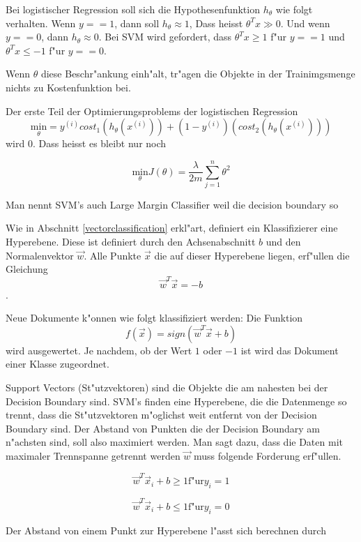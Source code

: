 \documentclass[12pt,a4paper,twoside]{article}
\begin{document}
Bei logistischer Regression soll sich die Hypothesenfunktion $h_{\theta}$ wie folgt verhalten.
Wenn $y == 1$, dann soll $h_{\theta} \approx 1$, Dass heisst $\theta^T x \gg 0$. Und wenn $y == 0$, dann $h_{\theta} \approx 0$. Bei SVM wird gefordert, dass $\theta^T x \geq 1$ f"ur $y == 1$ und $\theta^T x \leq -1$ f"ur $y == 0$.

Wenn $\theta$ diese Beschr"ankung einh"alt, tr"agen die Objekte in der Trainimgsmenge nichts zu Kostenfunktion bei.

Der erste Teil der Optimierungsproblems der logistischen Regression
\begin{equation}
  \label{eq:costsvm}
\underset{\theta}{\text{min}}   = y^{(i)} cost_1(h_{\theta}(x^{(i)})) + (1 - y^{(i)})(cost_2(h_{\theta}(x^{(i)}))) 
\end{equation}
wird 0. Dass heisst es bleibt nur noch

\begin{equation}
  \label{eq:opt}
  \underset{\theta}{\text{min}}  J(\theta) = \frac{\lambda}{2m} \sum_{j=1}^n \theta^2
\end{equation}

Man nennt SVM's auch Large Margin Classifier weil die decision boundary so

Wie in Abschnitt \ref{vectorclassification} erkl"art, definiert ein Klassifizierer eine Hyperebene. Diese ist definiert durch den Achsenabschnitt $b$ und den Normalenvektor $ \vec w $. Alle Punkte $\vec x $ die auf dieser Hyperebene liegen, erf"ullen die Gleichung 
\[
\vec w^T \vec x = -b
\].

Neue Dokumente k"onnen wie folgt klassifiziert werden: Die Funktion
\[
f(\vec x ) = sign( \vec w^T \vec x + b)
\]
wird ausgewertet. Je nachdem, ob der Wert $1$ oder $-1$ ist wird das Dokument einer Klasse zugeordnet.

Support Vectors (St"utzvektoren) sind die Objekte die am nahesten bei der Decision Boundary sind. SVM's finden eine Hyperebene, die die Datenmenge so trennt, dass die St"utzvektoren m"oglichst weit entfernt von der Decision Boundary sind. Der Abstand von Punkten die der Decision Boundary am n"achsten sind, soll also  maximiert werden. Man sagt dazu, dass die Daten mit maximaler Trennspanne getrennt werden $\vec w$ muss folgende Forderung erf"ullen.

\[
\vec w^T \vec x_i + b \geq 1 \text{f"ur} y_i = 1
\]

\[
\vec w^T \vec x_i + b \leq 1 \text{f"ur} y_i = 0
\]

Der Abstand von einem Punkt zur Hyperebene l"asst sich berechnen durch
\end{document}
